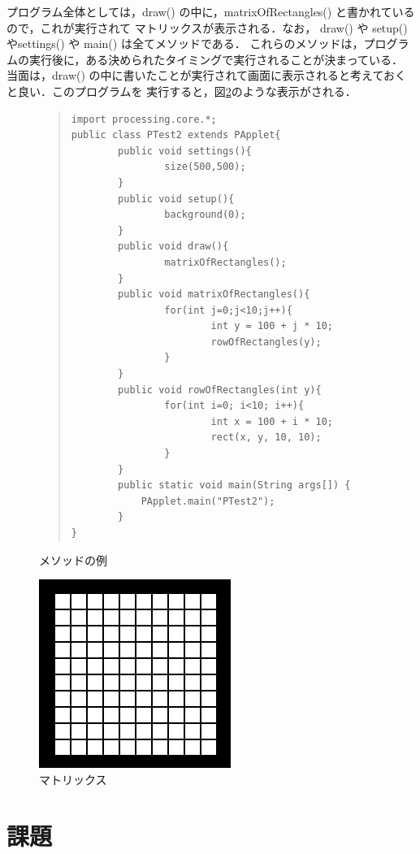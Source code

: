 \documentclass[a4paper,xelatex,ja=standard]{bxjsarticle}
\begin{document}
プログラム全体としては，draw() の中に，matrixOfRectangles() と書かれているので，これが実行されて
マトリックスが表示される．なお， draw() や setup() やsettings() や main() は全てメソッドである．
これらのメソッドは，プログラムの実行後に，ある決められたタイミングで実行されることが決まっている．
当面は，draw() の中に書いたことが実行されて画面に表示されると考えておくと良い．このプログラムを
実行すると，図\ref{matrix}のような表示がされる．

\begin{figure}[hbtp]
\lstset{numbers=left}
\begin{quote}
\begin{lstlisting}
import processing.core.*;
public class PTest2 extends PApplet{
        public void settings(){
                size(500,500);
        }
        public void setup(){
                background(0);
        }
        public void draw(){
                matrixOfRectangles();
        }
        public void matrixOfRectangles(){
                for(int j=0;j<10;j++){
                        int y = 100 + j * 10;
                        rowOfRectangles(y);
                }
        }
        public void rowOfRectangles(int y){
                for(int i=0; i<10; i++){
                        int x = 100 + i * 10;
                        rect(x, y, 10, 10);      
                }
        }
        public static void main(String args[]) {
            PApplet.main("PTest2");
        }
}
\end{lstlisting}
\end{quote}
\caption{メソッドの例}
\label{method1}
\end{figure}
\begin{figure}[hbtp]
\centerline{
 \includegraphics[scale=1.0]{matrix.png}
}
\caption{マトリックス}
\label{matrix}
\end{figure}


\section{課題}
\end{document}
